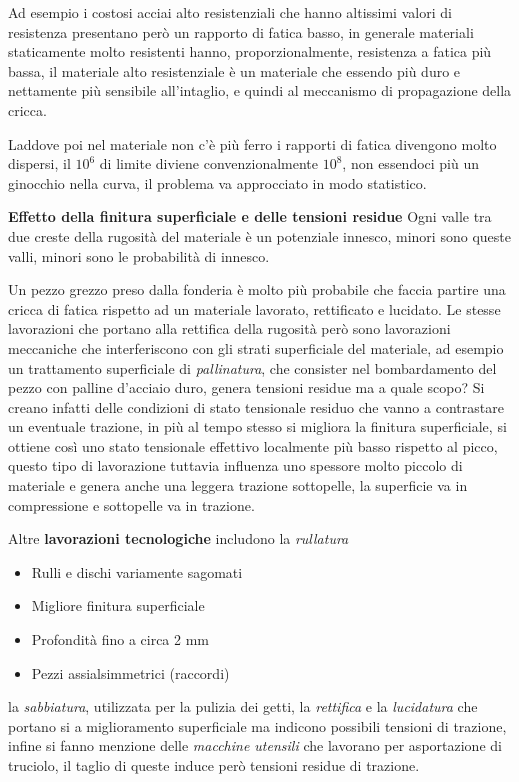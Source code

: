 \documentclass{article}
\begin{document}
\begin{adjustwidth}{2in}{}
			Ad esempio i costosi acciai alto resistenziali che hanno altissimi valori di resistenza presentano però un rapporto di fatica basso, in generale materiali staticamente molto resistenti hanno, proporzionalmente, resistenza a fatica più bassa, il materiale alto resistenziale è un materiale che essendo più duro e nettamente più sensibile all'intaglio, e quindi al meccanismo di propagazione della cricca.
			
			Laddove poi nel materiale non c'è più ferro i rapporti di fatica divengono molto dispersi, il $10^6$ di limite diviene convenzionalmente $10^8$, non essendoci più un ginocchio nella curva, il problema va approcciato in modo statistico. \newline			
			
			\textbf{\Large Effetto della finitura superficiale e delle tensioni residue} \newline
			 Ogni valle tra due creste della rugosità del materiale è un potenziale innesco, minori sono queste valli, minori sono le probabilità di innesco.
			 
			 Un pezzo grezzo preso dalla fonderia è molto più probabile che faccia partire una cricca di fatica rispetto ad un materiale lavorato, rettificato e lucidato. Le stesse lavorazioni che portano alla rettifica della rugosità però sono lavorazioni meccaniche che interferiscono  con gli strati superficiale del materiale, ad esempio un trattamento superficiale di \textit{pallinatura}, che consister nel bombardamento del pezzo con palline d'acciaio duro, genera tensioni residue ma a quale scopo? Si creano infatti delle condizioni di stato tensionale residuo che vanno a contrastare un eventuale trazione, in più al tempo stesso si migliora la finitura superficiale, si ottiene così uno stato tensionale effettivo localmente più basso rispetto al picco, questo tipo di lavorazione tuttavia influenza uno spessore molto piccolo di materiale e genera anche una leggera trazione sottopelle, la superficie va in compressione e sottopelle va in trazione. 
			 
			 Altre \textbf{lavorazioni tecnologiche} includono la \textit{rullatura}
			 \begin{itemize}
			 	\item Rulli e dischi variamente sagomati
			 	\item Migliore finitura superficiale
			 	\item Profondità fino a circa 2 mm
			 	\item Pezzi assialsimmetrici (raccordi)
			 \end{itemize}
		 	 la \textit{sabbiatura}, utilizzata per la pulizia dei getti, la \textit{rettifica} e la \textit{lucidatura} che portano si a miglioramento superficiale ma indicono possibili tensioni di trazione, infine si fanno menzione delle \textit{macchine utensili} che lavorano per asportazione di truciolo, il taglio di queste induce però tensioni residue di trazione.\newline 
		 	 

\end{adjustwidth}
\end{document}
